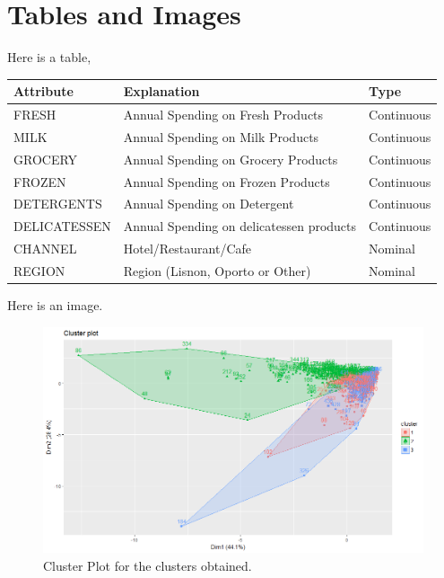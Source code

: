 \documentclass[a4paper,english,12pt]{paper}
\begin{document}
\section{Tables and Images}

Here is a table,
\begin{center}
\begin{tabu}{|l|l|l|}
\hline
\textbf{Attribute} & \textbf{Explanation} & \textbf{Type}\\ \hline \hline
FRESH & Annual Spending on Fresh Products & Continuous\\ \hline
MILK & Annual Spending on Milk Products & Continuous\\ \hline
GROCERY & Annual Spending on Grocery Products & Continuous\\ \hline
FROZEN & Annual Spending on Frozen Products & Continuous\\ \hline
DETERGENTS & Annual Spending on Detergent & Continuous\\ \hline
DELICATESSEN & Annual Spending on delicatessen products & Continuous\\ \hline
CHANNEL & Hotel/Restaurant/Cafe & Nominal\\ \hline
REGION & Region (Lisnon, Oporto or Other) & Nominal\\ \hline
\end{tabu}
\end{center}



Here is an image.
\begin{figure}[h]
\includegraphics[scale=0.6]{clust}
\caption{Cluster Plot for the clusters obtained.}
\label{clustplot}
\end{figure}





\newpage %



\end{document}
